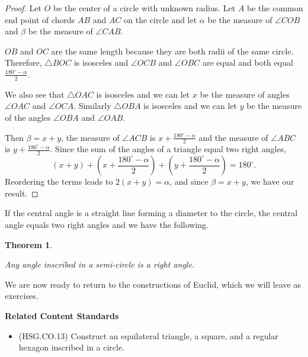 \documentclass[
]{book}
\providecommand{\tightlist}{%
  \setlength{\itemsep}{0pt}\setlength{\parskip}{0pt}}
\newenvironment{standards}{}{}
\newtheorem{theorem}{Theorem}[chapter]
\theoremstyle{definition}
\theoremstyle{definition}
\theoremstyle{definition}
\theoremstyle{definition}
\theoremstyle{remark}
\begin{document}
\begin{proof}

Let \(O\) be the center of a circle with unknown radius. Let \(A\) be the common end point of chords \(AB\) and \(AC\) on the circle and let \(\alpha\) be the measure of \(\angle COB\) and \(\beta\) be the measure of \(\angle CAB\).

\(OB\) and \(OC\) are the same length because they are both radii of the same circle. Therefore, \(\triangle BOC\) is isosceles and \(\angle OCB\) and \(\angle OBC\) are equal and both equal \(\frac{180^\circ - \alpha}{2}\).

We also see that \(\triangle OAC\) is isosceles and we can let \(x\) be the measure of angles \(\angle OAC\) and \(\angle OCA\). Similarly \(\triangle OBA\) is isosceles and we can let \(y\) be the measure of the angles \(\angle OBA\) and \(\angle OAB\).

Then \(\beta = x+y\), the measure of \(\angle ACB\) is \(x+\frac{180^\circ - \alpha}{2}\) and the measure of \(\angle ABC\) is \(y+\frac{180^\circ - \alpha}{2}\). Since the sum of the angles of a triangle equal two right angles,
\[(x+y) + \left(x+\frac{180^\circ - \alpha}{2}\right) + \left(y+\frac{180^\circ - \alpha}{2}\right) = 180^\circ.\]
Reordering the terms leads to \(2(x+y) = \alpha\), and since \(\beta=x+y\), we have our result.

\end{proof}

If the central angle is a straight line forming a diameter to the circle, the central angle equals two right angles and we have the following.

\begin{theorem}
\protect\hypertarget{thm:unlabeled-div-203}{}\label{thm:unlabeled-div-203}

Any angle inscribed in a semi-circle is a right angle.

\end{theorem}

We are now ready to return to the constructions of Euclid, which we will leave as exercises.

\begin{standards}

\begin{center}
\textbf{Related Content Standards}

\end{center}

\begin{itemize}
\tightlist
\item
  (HSG.CO.13) Construct an equilateral triangle, a square, and a regular hexagon inscribed in a circle.
\end{itemize}

\end{standards}
\end{document}
